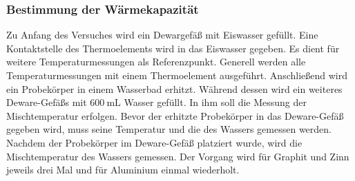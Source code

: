 \subsubsection{Bestimmung der Wärmekapazität}
Zu Anfang des Versuches wird ein Dewargefäß mit Eiswasser gefüllt.
Eine Kontaktstelle des Thermoelements wird in das Eiswasser gegeben.
Es dient für weitere Temperaturmessungen als Referenzpunkt. %
Generell werden alle Temperaturmessungen mit einem Thermoelement ausgeführt.
Anschließend wird ein Probekörper in einem Wasserbad erhitzt.
Während dessen wird ein weiteres Deware-Gefäßs mit $\SI{600}{\milli\liter}$ Wasser gefüllt. %
In ihm soll die Messung der Mischtemperatur erfolgen.
Bevor der erhitzte Probekörper in das Deware-Gefäß gegeben wird, muss 
seine Temperatur und die des Wassers gemessen werden. %
Nachdem der Probekörper im Deware-Gefäß platziert wurde, wird die Mischtemperatur des
Wassers gemessen. Der Vorgang wird für Graphit und Zinn jeweils drei Mal und für
Aluminium einmal wiederholt.
